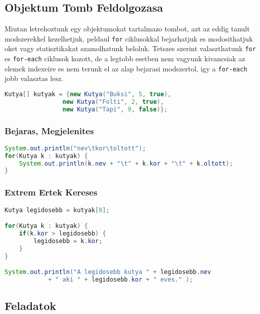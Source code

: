\documentclass{article}
\let\l\lstinline
\begin{document}
\newpage

\subsection{Objektum Tomb Feldolgozasa}

Miutan letrehoztunk egy objektumokat tartalmazo tombot, azt az eddig tanult modszerekkel kezelhetjuk, peldaul \l{for}
ciklusokkal bejarhatjuk es modosithatjuk oket vagy statisztikakat szamolhatunk beloluk. Tetszes szerint valaszthatunk
\l{for} es \l{for-each} ciklusok kozott, de a legtobb esetben nem vagyunk kivancsiak az elemek indexeire es nem
terunk el az alap bejarasi modszertol, igy a \l{for-each} jobb  valasztas lesz.

\begin{lstlisting}[language=Java, caption=A kutya tomb amivel dolgozni fogunk a kovetkezo peldakban]
Kutya[] kutyak = {new Kutya("Buksi", 5, true),
                new Kutya("Folti", 2, true),
                new Kutya("Tapi", 9, false)};
\end{lstlisting}

\subsubsection{Bejaras, Megjelenites}

\begin{lstlisting}[language=Java, caption=Kutyak adatainak megjelenitese]
System.out.println("nev\tkor\toltott");
for(Kutya k : kutyak) {
    System.out.println(k.nev + "\t" + k.kor + "\t" + k.oltott);
}
\end{lstlisting}

\subsubsection{Extrem Ertek Kereses}

\begin{lstlisting}[language=Java, caption=Legidosebb kutya megkeresese]
Kutya legidosebb = kutyak[0];

for(Kutya k : kutyak) {
    if(k.kor > legidosebb) {
        legidosebb = k.kor;
    }
}

System.out.println("A legidosebb kutya " + legidosebb.nev
            + " aki " + legidosebb.kor + " eves." );
\end{lstlisting}

\newpage

\subsection{Feladatok}
\end{document}
